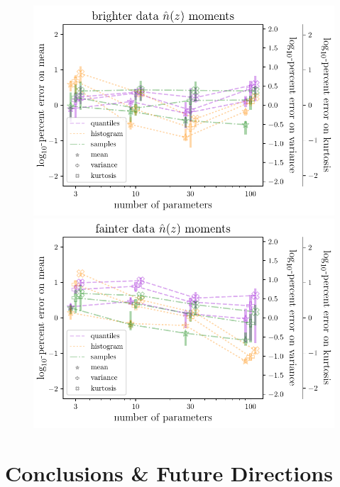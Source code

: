 \documentclass[\docopts]{\docclass}
\begin{document}
\begin{figure}
  \begin{center}
    \includegraphics[width=\columnwidth]{graham_nz_err.pdf}    
\includegraphics[width=\columnwidth]{schmidt_nz_err.pdf}
    \caption{
    \label{fig:nz_moment_errs}}
  \end{center}
\end{figure}





\section{Conclusions \& Future Directions}
\label{sec:conclusions}
\end{document}
